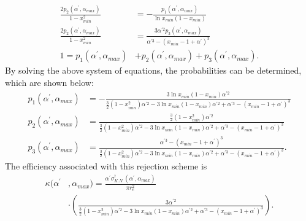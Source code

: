 \begin{align}
  \frac{2p_2(\alpha^{'},\alpha_{max})}{1-x_{min}^2} & = 
  -\frac{p_1(\alpha^{'},\alpha_{max})}{\ln{x_{min}}\left(1-x_{min}\right)} \\
  \frac{2p_2(\alpha^{'},\alpha_{max})}{1-x_{min}^2} & = 
  \frac{3\alpha^{'2}p_3(\alpha^{'},\alpha_{max})}
       {\alpha^{'3} - \left(x_{min}-1+\alpha^{'}\right)^3} \\
  1 = p_1(\alpha^{'},\alpha_{max}) & + p_2(\alpha^{'},\alpha_{max}) +
  p_3(\alpha^{'},\alpha_{max}).
\end{align}
By solving the above system of equations, the probabilities can be determined, 
which are shown below:
\begin{align}
  p_1(\alpha^{'},\alpha_{max}) & = 
  -\frac{3\ln{x_{min}}\left(1-x_{min}\right)\alpha^{'2}}
  {\frac{3}{2}\left(1-x_{min}^2\right)\alpha^{'2} - 
    3\ln{x_{min}}\left(1-x_{min}\right)\alpha^{'2} + \alpha^{'3} - 
    \left(x_{min}-1+\alpha^{'}\right)^3} \\
  p_2(\alpha^{'},\alpha_{max}) & = 
  \frac{\frac{3}{2}\left(1-x_{min}^2\right)\alpha^{'2}}
  {\frac{3}{2}\left(1-x_{min}^2\right)\alpha^{'2} - 
    3\ln{x_{min}}\left(1-x_{min}\right)\alpha^{'2} + \alpha^{'3} - 
    \left(x_{min}-1+\alpha^{'}\right)^3} \\
  p_3(\alpha^{'},\alpha_{max}) & =
  \frac{\alpha^{'3} - \left(x_{min}-1+\alpha^{'}\right)^3}
  {\frac{3}{2}\left(1-x_{min}^2\right)\alpha^{'2} - 
    3\ln{x_{min}}\left(1-x_{min}\right)\alpha^{'2} + \alpha^{'3} - 
    \left(x_{min}-1+\alpha^{'}\right)^3}.
\end{align}
The efficiency associated with this rejection scheme is 
\begin{align}
  \kappa(\alpha^{'}&,\alpha_{max}) = 
  \frac{\alpha^{'}\sigma_{K.N.}^{\dagger}(\alpha^{'},\alpha_{max})}{\pi r_e^2}
  \nonumber \\
  &\cdot \left(\frac{3\alpha^{'2}}{\frac{3}{2}\left(1-x_{min}^2\right)\alpha^{'2} 
    -3\ln{x_{min}}\left(1-x_{min}\right)\alpha^{'2} + \alpha^{'3} - 
    \left(x_{min}-1+\alpha^{'}\right)^3}\right).
\end{align}
  
